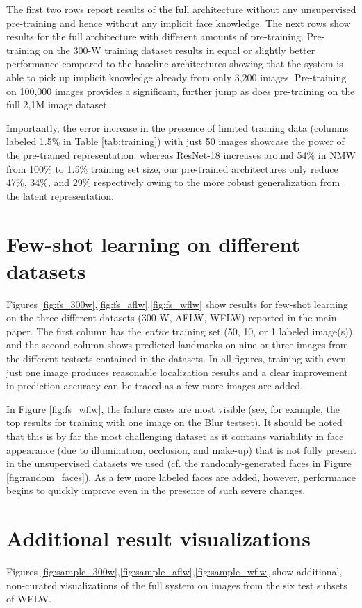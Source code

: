 \documentclass[10pt,twocolumn,letterpaper]{article}
\begin{document}
The first two rows report results of the full architecture without any unsupervised pre-training and hence without any implicit face knowledge. The next rows show results for the full architecture with different amounts of pre-training. Pre-training on the 300-W training dataset results in equal or slightly better performance compared to the baseline architectures showing that the system is able to pick up implicit knowledge already from only 3,200 images. Pre-training on 100,000 images provides a significant, further jump as does pre-training on the full 2,1M image dataset.

Importantly, the error increase in the presence of limited training data (columns labeled 1.5\% in Table \ref{tab:training}) with just 50 images showcase the power of the pre-trained representation: whereas ResNet-18 increases around 54\% in NMW from 100\% to 1.5\% training set size, our pre-trained architectures only reduce 47\%, 34\%, and 29\% respectively owing to the more robust generalization from the latent representation.


\section{Few-shot learning on different datasets}\label{fewshot}

Figures \ref{fig:fs_300w},\ref{fig:fs_aflw},\ref{fig:fs_wflw} show results for few-shot learning on the three different datasets (300-W, AFLW, WFLW) reported in the main paper. The first column has the {\em entire} training set (50, 10, or 1 labeled image(s)), and the second column shows predicted landmarks on nine or three images from the different testsets contained in the datasets. In all figures, training with even just one image produces reasonable localization results and a clear improvement in prediction accuracy can be traced as a few more images are added.

In Figure \ref{fig:fs_wflw}, the failure cases are most visible (see, for example, the top results for training with one image on the Blur testset). It should be noted that this is by far the most challenging dataset as it contains variability in face appearance (due to illumination, occlusion, and make-up) that is not fully present in the unsupervised datasets we used (cf. the randomly-generated faces in Figure \ref{fig:random_faces}). As a few more labeled faces are added, however, performance begins to quickly improve even in the presence of such severe changes. 


\section{Additional result visualizations}\label{added}
Figures \ref{fig:sample_300w},\ref{fig:sample_aflw},\ref{fig:sample_wflw} show additional, non-curated visualizations of the full system on images from the six test subsets of WFLW.
\end{document}

